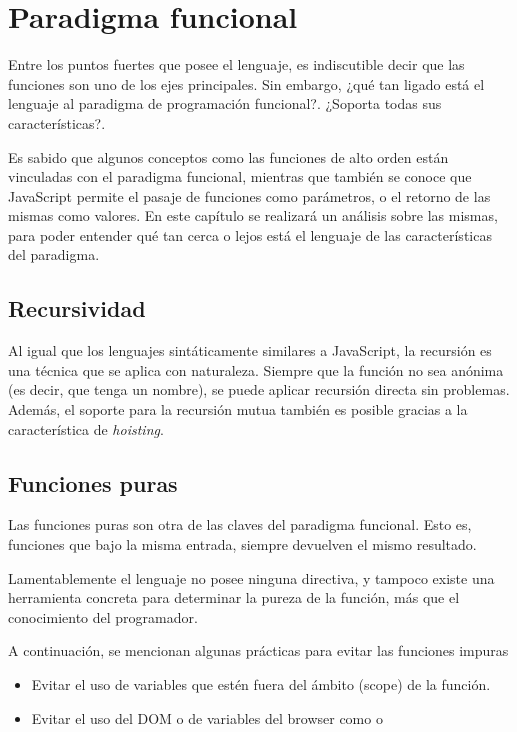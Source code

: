 \chapter{Paradigma funcional}

\label{Chapter3}


Entre los puntos fuertes que posee el lenguaje, es indiscutible decir que las funciones son uno de los ejes principales. Sin embargo, ¿qué tan ligado está el lenguaje al paradigma de programación funcional?. ¿Soporta todas sus características?.

Es sabido que algunos conceptos como las funciones de alto orden están vinculadas con el paradigma funcional, mientras que también se conoce que JavaScript permite el pasaje de funciones como parámetros, o el retorno de las mismas como valores. En este capítulo se realizará un análisis sobre las mismas, para poder entender qué tan cerca o lejos está el lenguaje de las características del paradigma.


\section{Recursividad}

Al igual que los lenguajes sintáticamente similares a JavaScript, la recursión es una técnica que se aplica con naturaleza. Siempre que la función no sea anónima (es decir, que tenga un nombre), se puede aplicar recursión directa sin problemas. Además, el soporte para la recursión mutua también es posible gracias a la característica de \textit{hoisting}.

\section{Funciones puras}

Las funciones puras son otra de las claves del paradigma funcional. Esto es, funciones que bajo la misma entrada, siempre devuelven el mismo resultado.

Lamentablemente el lenguaje no posee ninguna directiva, y tampoco existe una herramienta concreta para determinar la pureza de la función, más que el conocimiento del programador.

A continuación, se mencionan algunas prácticas para evitar las funciones impuras

\begin{itemize}
  \item Evitar el uso de variables que estén fuera del ámbito (scope) de la función.
  \item Evitar el uso del DOM o de variables del browser como  o 
\end{itemize}


